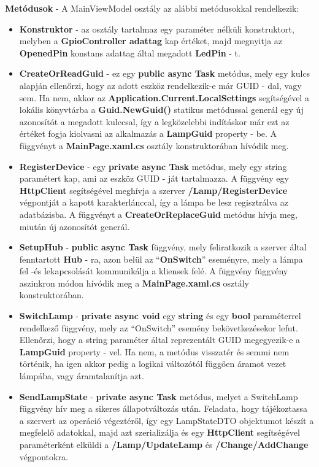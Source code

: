 \documentclass[a4paper,12pt]{report}
\begin{document}
    \textbf{Metódusok} - A MainViewModel osztály az alábbi metódusokkal rendelkezik:

 \begin{itemize}
     \item \textbf{Konstruktor} - az osztály tartalmaz egy paraméter nélküli konstruktort, melyben a \textbf{GpioController adattag} kap értéket,
     majd megnyitja az \textbf{OpenedPin} konstans adattag által megadott \textbf{LedPin} - t.
     \item \textbf{CreateOrReadGuid} - ez egy \textbf{public async Task} metódus, mely egy kulcs alapján ellenőrzi, hogy az adott eszköz
     rendelkezik-e már GUID - dal, vagy sem. Ha nem, akkor az \textbf{Application.Current.LocalSettings} segítségével a lokális könyvtárba
     a \textbf{Guid.NewGuid()} statikus metódussal generál egy új azonosítót a megadott kulccsal, így a legközelebbi indításkor már ezt az értéket
     fogja kiolvasni az alkalmazás a \textbf{LampGuid} property - be. A függvényt a \textbf{MainPage.xaml.cs} osztály konstruktorában hívódik meg.
     \item \textbf{RegisterDevice} - egy \textbf{private async Task} metódus, mely egy string paramétert kap, ami az eszköz GUID - ját tartalmazza.
     A függvény egy \textbf{HttpClient} segítségével meghívja a szerver \textbf{/Lamp/RegisterDevice} végpontját a kapott karakterlánccal, így
     a lámpa be lesz regisztrálva az adatbázisba. A függvényt a \textbf{CreateOrReplaceGuid} metódus hívja meg, miután új azonosítót generál.
     \item \textbf{SetupHub} - \textbf{public async Task} függvény, mely feliratkozik a szerver által fenntartott \textbf{Hub} - ra, azon belül
     az ``\textbf{OnSwitch}'' eseményre, mely a lámpa fel -és lekapcsolását kommunikálja a kliensek felé. A függvény függvény aszinkron módon hívódik
     meg a \textbf{MainPage.xaml.cs} osztály konstruktorában.
     \item \textbf{SwitchLamp} - \textbf{private async void} egy \textbf{string} és egy \textbf{bool} paraméterrel rendelkező függvény, mely az ``OnSwitch''
     esemény bekövetkezésekor lefut. Ellenőrzi, hogy a string paraméter által reprezentált GUID megegyezik-e a \textbf{LampGuid} property - vel. Ha nem,
     a metódus visszatér és semmi nem történik, ha igen akkor pedig a logikai változótól függően áramot vezet lámpába, vagy áramtalanítja azt.
     \item \textbf{SendLampState} - \textbf{private async Task} metódus, melyet a SwitchLamp függvény hív meg a sikeres állapotváltozás után.
     Feladata, hogy tájékoztassa a szervert az operáció végeztéről, így egy LampStateDTO objektumot készít a megfelelő adatokkal, majd azt szerializálja
     és egy \textbf{HttpClient} segítségével paraméterként elküldi a \textbf{/Lamp/UpdateLamp} és \textbf{/Change/AddChange} végpontokra.
 \end{itemize}
\end{document}
